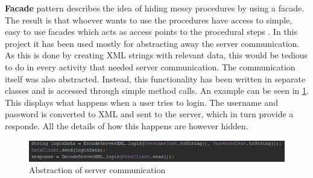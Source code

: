 \textbf{Facade} pattern describes the idea of hiding messy procedures by using a facade. The result is that whoever wants to use the procedures have access to simple, easy to use facades which acts as access points to the procedural steps \cite{facpat}. In this project it has been used mostly for abstracting away the server communication. As this is done by creating XML strings with relevant data, this would be tedious to do in every activity that needed server communication. The communication itself was also abstracted. Instead, this functionality has been written in separate classes and is accessed through simple method calls. An example can be seen in \ref{fig:facadepattern}. This displays what happens when a user tries to login. The username and password is converted to XML and sent to the server, which in turn provide a responde. All the details of how this happens are however hidden.

\begin{figure}[H]
\centering
\includegraphics[width=\textwidth]{billeder/facadepattern.png}
\caption{Abstraction of server communication}
\label{fig:facadepattern}
\end{figure} 

